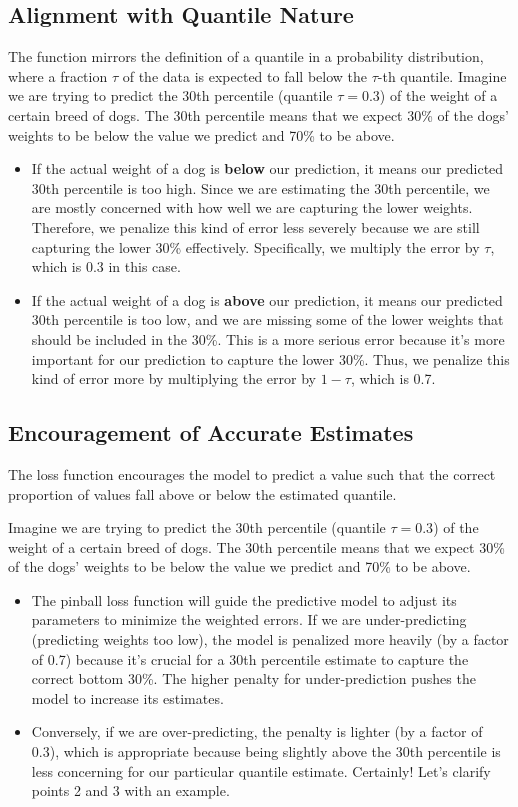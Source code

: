 \documentclass{article}
\begin{document}
\subsection{Alignment with Quantile Nature}
The function mirrors the definition of a quantile in a probability distribution, where a fraction \( \tau \) of the data is expected to fall below the \( \tau \)-th quantile.
Imagine we are trying to predict the 30th percentile (quantile \( \tau = 0.3 \)) of the weight of a certain breed of dogs. The 30th percentile means that we expect 30\% of the dogs' weights to be below the value we predict and 70\% to be above.
\begin{itemize}
    \item If the actual weight of a dog is \textbf{below} our prediction, it means our predicted 30th percentile is too high. Since we are estimating the 30th percentile, we are mostly concerned with how well we are capturing the lower weights. Therefore, we penalize this kind of error less severely because we are still capturing the lower 30\% effectively. Specifically, we multiply the error by \( \tau \), which is 0.3 in this case.
    \item If the actual weight of a dog is \textbf{above} our prediction, it means our predicted 30th percentile is too low, and we are missing some of the lower weights that should be included in the 30\%. This is a more serious error because it's more important for our prediction to capture the lower 30\%. Thus, we penalize this kind of error more by multiplying the error by \( 1 - \tau \), which is 0.7.

\end{itemize}

\subsection{Encouragement of Accurate Estimates}
The loss function encourages the model to predict a value such that the correct proportion of values fall above or below the estimated quantile.

Imagine we are trying to predict the 30th percentile (quantile \( \tau = 0.3 \)) of the weight of a certain breed of dogs. The 30th percentile means that we expect 30\% of the dogs' weights to be below the value we predict and 70\% to be above.
\begin{itemize}
    \item The pinball loss function will guide the predictive model to adjust its parameters to minimize the weighted errors. If we are under-predicting (predicting weights too low), the model is penalized more heavily (by a factor of 0.7) because it’s crucial for a 30th percentile estimate to capture the correct bottom 30\%. The higher penalty for under-prediction pushes the model to increase its estimates.
    \item Conversely, if we are over-predicting, the penalty is lighter (by a factor of 0.3), which is appropriate because being slightly above the 30th percentile is less concerning for our particular quantile estimate.
Certainly! Let's clarify points 2 and 3 with an example.
\end{itemize}
\end{document}
